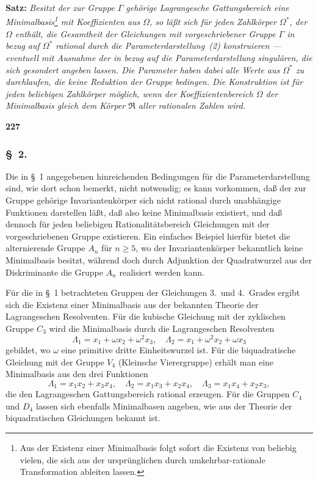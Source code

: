 \documentclass[12pt,a4paper]{article}
\begin{document}
\smallskip
\textbf{Satz:} \emph{Besitzt der zur Gruppe $\Gamma$ geh\"orige Lagrangesche Gattungsbereich eine Minimalbasis\footnote{Aus der Existenz einer Minimalbasis folgt sofort die Existenz von beliebig vielen, die sich aus der urspr\"unglichen durch umkehrbar-rationale Transformation ableiten lassen.} mit Koeffizienten aus $\Omega$, so l\"a\ss t sich f\"ur jeden Zahlk\"orper $\Omega^*$, der $\Omega$ enth\"alt, die Gesamtheit der Gleichungen mit vorgeschriebener Gruppe $\Gamma$ in bezug auf $\Omega^*$ rational durch die Parameterdarstellung~(2) konstruieren --- eventuell mit Ausnahme der in bezug auf die Parameterdarstellung singul\"aren, die sich gesondert angeben lassen. Die Parameter haben dabei alle Werte aus $\Omega^*$ zu durchlaufen, die keine Reduktion der Gruppe bedingen. Die Konstruktion ist f\"ur jeden beliebigen Zahlk\"orper m\"oglich, wenn der Koeffizientenbereich $\Omega$ der Minimalbasis gleich dem K\"orper $\mathfrak{R}$ aller rationalen Zahlen wird.}

\newpage
\begin{center}
\textbf{227}
\end{center}

\subsubsection*{\S\ 2.}

Die in \S\ 1 angegebenen hinreichenden Bedingungen f\"ur die Parameterdarstellung sind, wie dort schon bemerkt, nicht notwendig; es kann vorkommen, da\ss{} der zur Gruppe geh\"orige Invariantenk\"orper sich nicht rational durch unabh\"angige Funktionen darstellen l\"a\ss t, da\ss{} also keine Minimalbasis existiert, und da\ss{} dennoch f\"ur jeden beliebigen Rationalit\"atsbereich Gleichungen mit der vorgeschriebenen Gruppe existieren. Ein einfaches Beispiel hierf\"ur bietet die alternierende Gruppe $A_n$ f\"ur $n \ge 5$, wo der Invariantenk\"orper bekanntlich keine Minimalbasis besitzt, w\"ahrend doch durch Adjunktion der Quadratwurzel aus der Diskriminante die Gruppe $A_n$ realisiert werden kann.

F\"ur die in \S\ 1 betrachteten Gruppen der Gleichungen 3.\ und 4.\ Grades ergibt sich die Existenz einer Minimalbasis aus der bekannten Theorie der Lagrangeschen Resolventen. F\"ur die kubische Gleichung mit der zyklischen Gruppe $C_3$ wird die Minimalbasis durch die Lagrangeschen Resolventen
\[\Lambda_1 = x_1 + \omega x_2 + \omega^2 x_3, \quad \Lambda_2 = x_1 + \omega^2 x_2 + \omega x_3\]
gebildet, wo $\omega$ eine primitive dritte Einheitswurzel ist. F\"ur die biquadratische Gleichung mit der Gruppe $V_4$ (Kleinsche Vierergruppe) erh\"alt man eine Minimalbasis aus den drei Funktionen
\[\Lambda_1 = x_1 x_2 + x_3 x_4, \quad \Lambda_2 = x_1 x_3 + x_2 x_4, \quad \Lambda_3 = x_1 x_4 + x_2 x_3,\]
die den Lagrangeschen Gattungsbereich rational erzeugen. F\"ur die Gruppen $C_4$ und $D_4$ lassen sich ebenfalls Minimalbasen angeben, wie aus der Theorie der biquadratischen Gleichungen bekannt ist.
\end{document}

